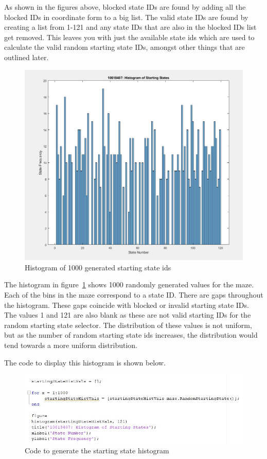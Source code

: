 \documentclass [11pt]{article}
\begin{document}
As shown in the figures above, blocked state IDs are found by adding all the blocked IDs in coordinate form to a big list. The valid state IDs are found by creating a list from 1-121 and any state IDs that are also in the blocked IDs list get removed. This leaves you with just the available state ids which are used to calculate the valid random starting state IDs, amongst other things that are outlined later. 

\begin{figure}[H]
\centerline{\includegraphics[width=15cm]{Histogram_of_starting_states}}
\caption{Histogram of 1000 generated starting state ids}
\label{fig:random_state_ids_histogram}
\end{figure}

The histogram in figure~\ref{fig:random_state_ids_histogram} shows 1000 randomly generated values for the maze. Each of the bins in the maze correspond to a state ID. There are gaps throughout the histogram. These gaps coincide with blocked or invalid starting state IDs. The values 1 and 121 are also blank as these are not valid starting IDs for the random starting state selector. The distribution of these values is not uniform, but as the number of random starting state ids increases, the distribution would tend towards a more uniform distribution. 

The code to display this histogram is shown below.

\begin{figure}[H]
\centerline{\includegraphics[width=15cm]{code_to_output_start_state_histo}}
\caption{Code to generate the starting state histogram}
\label{fig:random_state_ids_histogram_code}
\end{figure}
\end{document}
